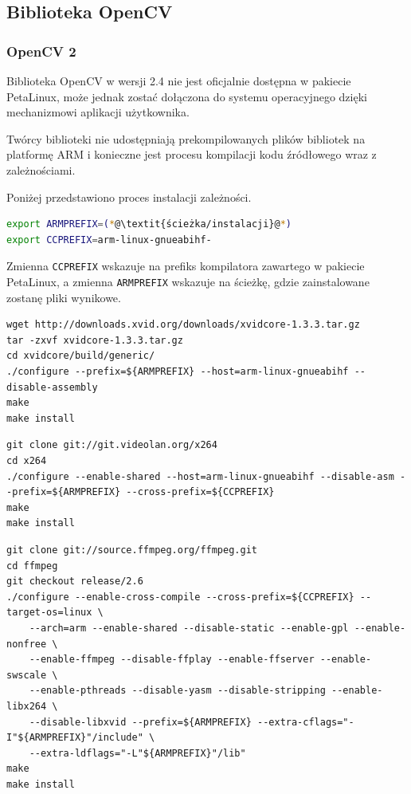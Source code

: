 \subsection{Biblioteka OpenCV}
\label{sec:opencv-config}
\subsubsection{OpenCV 2}
Biblioteka OpenCV w wersji 2.4 nie jest oficjalnie dostępna w pakiecie PetaLinux, może jednak zostać dołączona do systemu operacyjnego dzięki mechanizmowi aplikacji użytkownika.

Twórcy biblioteki nie udostępniają prekompilowanych plików bibliotek na platformę ARM i konieczne jest procesu kompilacji kodu źródłowego wraz z zależnościami.

Poniżej przedstawiono proces instalacji zależności.

\begin{lstlisting}[breaklines=true, language=Bash, caption=Definicja zmiennych środowiskowych.]
export ARMPREFIX=(*@\textit{ścieżka/instalacji}@*)
export CCPREFIX=arm-linux-gnueabihf-
\end{lstlisting}
Zmienna \texttt{CCPREFIX} wskazuje na prefiks kompilatora zawartego w pakiecie PetaLinux, a zmienna \texttt{ARMPREFIX} wskazuje na ścieżkę, gdzie zainstalowane zostanę pliki wynikowe.

\begin{lstlisting}[breaklines=true, caption=Kompilacja biblioteki \textit{xVideo}.]
wget http://downloads.xvid.org/downloads/xvidcore-1.3.3.tar.gz
tar -zxvf xvidcore-1.3.3.tar.gz
cd xvidcore/build/generic/
./configure --prefix=${ARMPREFIX} --host=arm-linux-gnueabihf --disable-assembly
make
make install
\end{lstlisting}

\begin{lstlisting}[breaklines=true, caption=Kompilacja biblioteki \textit{x264}.]
git clone git://git.videolan.org/x264
cd x264
./configure --enable-shared --host=arm-linux-gnueabihf --disable-asm --prefix=${ARMPREFIX} --cross-prefix=${CCPREFIX}
make
make install
\end{lstlisting}

\begin{lstlisting}[breaklines=true, caption=Kompilacja biblioteki \textit{ffmpeg}.]
git clone git://source.ffmpeg.org/ffmpeg.git
cd ffmpeg
git checkout release/2.6
./configure --enable-cross-compile --cross-prefix=${CCPREFIX} --target-os=linux \
	--arch=arm --enable-shared --disable-static --enable-gpl --enable-nonfree \
	--enable-ffmpeg --disable-ffplay --enable-ffserver --enable-swscale \
	--enable-pthreads --disable-yasm --disable-stripping --enable-libx264 \
	--disable-libxvid --prefix=${ARMPREFIX} --extra-cflags="-I"${ARMPREFIX}"/include" \
	--extra-ldflags="-L"${ARMPREFIX}"/lib"
make
make install
\end{lstlisting}

